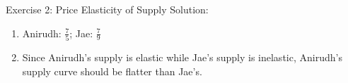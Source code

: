 \documentclass[9pt, handout]{beamer}
\begin{document}
\begin{frame}{Exercise 2: Price Elasticity of Supply}
    Solution: 
    \begin{enumerate}
        \item Anirudh: $\frac{7}{5}$; Jae: $\frac{7}{9}$
        \item Since Anirudh's supply is elastic while Jae's supply is inelastic, Anirudh's supply curve should be flatter than Jae's. 
    \end{enumerate}
\end{frame}
\end{document}
